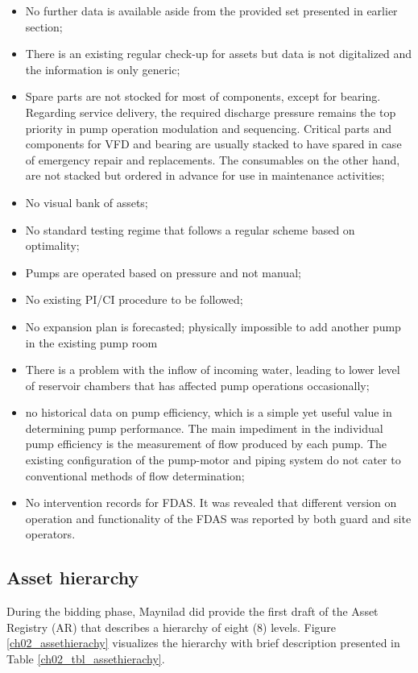 \begin{itemize}
\item No further data is available aside from the provided set presented in earlier section;
\item There is an existing regular check-up for assets but data is not digitalized and the information is only generic;
\item Spare parts are not stocked for most of components, except for bearing. Regarding service delivery, the required discharge pressure remains the top priority in pump operation modulation and sequencing. Critical parts and components for VFD and bearing are usually stacked to have spared in case of emergency repair and replacements. The consumables on the other hand, are not stacked but ordered in advance for use in maintenance activities;
\item No visual bank of assets;
\item No standard testing regime that follows a regular scheme based on optimality;
\item Pumps are operated based on pressure and not manual;
\item No existing PI/CI procedure to be followed;
\item No expansion plan is forecasted; physically impossible to add another pump in the existing pump room
\item There is a problem with the inflow of incoming water, leading to lower level of reservoir chambers that has affected pump operations occasionally;
\item no historical data on pump efficiency, which is a simple yet useful value in determining pump performance. The main impediment in  the individual pump efficiency is the measurement of flow produced by each pump. The existing configuration of the pump-motor and piping system do not cater to conventional methods of flow determination;
\item No intervention records for FDAS. It was revealed that different version on operation and functionality of the FDAS was reported by both guard and site operators.
\end{itemize}

\subsection{Asset hierarchy}
\label{214}
During the bidding phase, Maynilad did provide the first draft of the Asset Registry (AR) that describes a hierarchy of eight (8) levels. Figure \ref{ch02_assethierachy} visualizes the hierarchy with brief description presented in Table \ref{ch02_tbl_assethierachy}.

